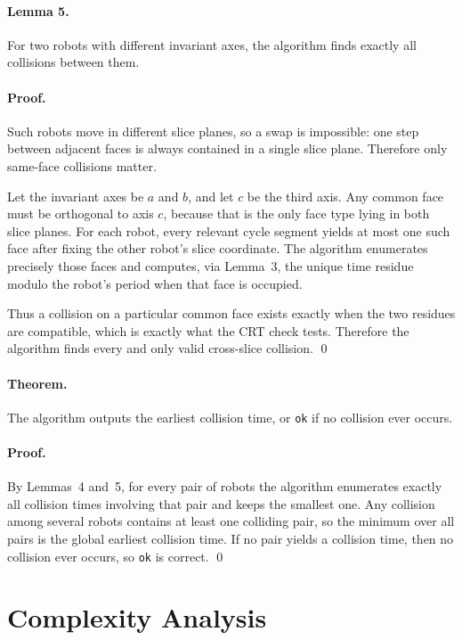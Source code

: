 \documentclass[11pt]{article}
\begin{document}
\paragraph{Lemma 5.}
For two robots with different invariant axes, the algorithm finds exactly all collisions between them.

\paragraph{Proof.}
Such robots move in different slice planes, so a swap is impossible: one step between adjacent faces is always contained
in a single slice plane.
Therefore only same-face collisions matter.

Let the invariant axes be $a$ and $b$, and let $c$ be the third axis.
Any common face must be orthogonal to axis $c$, because that is the only face type lying in both slice planes.
For each robot, every relevant cycle segment yields at most one such face after fixing the other robot's slice
coordinate. The algorithm enumerates precisely those faces and computes, via Lemma~3, the unique time residue modulo the
robot's period when that face is occupied.

Thus a collision on a particular common face exists exactly when the two residues are compatible, which is exactly what
the CRT check tests. Therefore the algorithm finds every and only valid cross-slice collision. \qed

\paragraph{Theorem.}
The algorithm outputs the earliest collision time, or \texttt{ok} if no collision ever occurs.

\paragraph{Proof.}
By Lemmas~4 and~5, for every pair of robots the algorithm enumerates exactly all collision times involving that pair and
keeps the smallest one. Any collision among several robots contains at least one colliding pair, so the minimum over all
pairs is the global earliest collision time. If no pair yields a collision time, then no collision ever occurs, so
\texttt{ok} is correct. \qed

\section*{Complexity Analysis}
\end{document}
